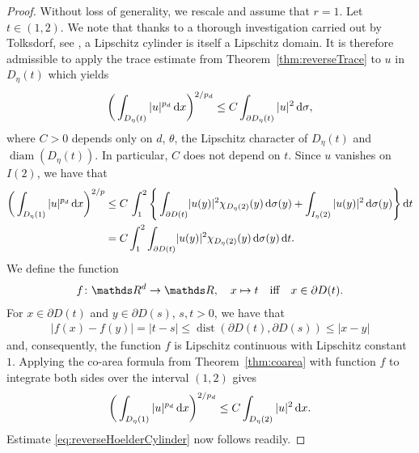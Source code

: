\begin{proof}
  Without loss of generality, we rescale and assume that $r = 1$.
  Let $t \in (1,2)$. 
  We note that thanks to a thorough investigation carried out by Tolksdorf, see \cite[Lem.\@~1.3.25]{tolksdorf}, a Lipschitz cylinder is itself a Lipschitz domain.
  It is therefore admissible to apply the trace estimate from Theorem~\ref{thm:reverseTrace} to $u$ in $D_\eta(t)$ which yields
  \begin{align*}
    \bigg( \int_{D_\eta(t)} |u|^{p_d} \, {\operatorname{d}\!{x}} \bigg)^{2/p_d} \leq C \int_{\partial D_\eta(t)} |u|^2 \, {\operatorname{d}\!{\sigma}},
  \end{align*}
  where $C > 0$ depends only on $d$, $\theta$, the Lipschitz character of $D_\eta(t)$ and $\operatorname{diam}(D_\eta(t))$. 
  In particular, $C$ does not depend on $t$.
  Since $u$ vanishes on $I(2)$, we have that
  \begin{align*}
    \bigg( \int_{D_\eta(1)} |u|^{p_d} \d x \bigg)^{2/p} 
    &\leq C\, \int_1^2 \Bigg\{  \int_{\partial D(t)} \! |u(y)|^2 \chi_{D_\eta(2)}(y) \d\sigma(y) +  \int_{I_\eta(2)} |u(y)|^2 \d \sigma(y) \Bigg\} \d t  \\
    &= C \int_1^2 \int_{\partial D(t)} \! |u(y)|^2 \chi_{D_\eta(2)}(y) \d\sigma(y) \d t.
  \end{align*}
  We define the function
  \begin{align*}
    f \colon \R^d \to \R, \quad x \mapsto t \quad\text{iff}\quad x \in \partial D(t).
  \end{align*}
  For $x \in \partial D(t)$ and $y \in \partial D(s)$, $s,t > 0$, we have that
  \begin{align*}
    |f(x) - f(y)| = |t - s| \leq \operatorname{dist}(\partial D(t), \partial D(s)) \leq |x- y|
  \end{align*}
  and, consequently, the function $f$ is Lipschitz continuous with Lipschitz constant $1$.
  Applying the co-area formula from Theorem~\ref{thm:coarea} with function $f$ to integrate both sides over the interval $(1,2)$ gives
  \begin{align*}
    \bigg( \int_{D_\eta(1)} |u|^{p_d} \, {\operatorname{d}\!{x}} \bigg)^{2/{p_d}} \leq C \int_{D_\eta(2)} |u|^2 \, {\operatorname{d}\!{x}}.
  \end{align*}
  Estimate \eqref{eq:reverseHoelderCylinder} now follows readily.
\end{proof}

